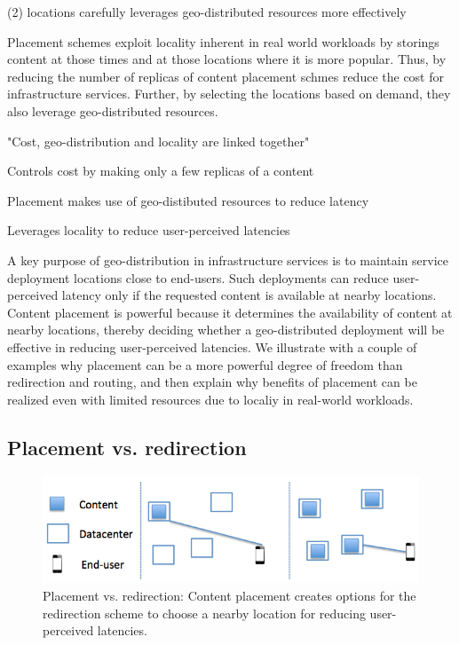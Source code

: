 (2) locations carefully leverages geo-distributed resources more effectively 




Placement schemes exploit locality inherent in real world workloads by storings content at those times and at those locations where it is more popular. Thus, by reducing the number of replicas of content placement schmes reduce the cost for infrastructure services. Further, by selecting the locations based on demand, they also leverage geo-distributed resources. 


"Cost, geo-distribution and locality are linked together"



Controls cost by making only a few replicas of a content



Placement makes use of geo-distibuted resources to reduce latency


Leverages locality to reduce user-perceived latencies




A key purpose of geo-distribution in infrastructure services is to maintain service deployment locations close to end-users.  Such deployments can reduce user-perceived latency only if the requested content is available at nearby locations. Content placement is powerful because it determines the availability of content at nearby locations, thereby deciding whether a geo-distributed deployment will be effective in reducing user-perceived latencies. We illustrate with a couple of examples why placement can be a more powerful degree of freedom than redirection and routing, and then explain why benefits of placement can be realized even with limited resources due to localiy in real-world workloads. 

\subsection{Placement vs. redirection}

\begin{figure}
	\centering
	\includegraphics[scale=0.5]{fig/placement-vs-redirection.png}
	\caption{Placement vs. redirection: Content placement creates options for the redirection scheme to choose a nearby location for reducing user-perceived latencies.}	
	\label{fig:placement-redirection}
\end{figure}

